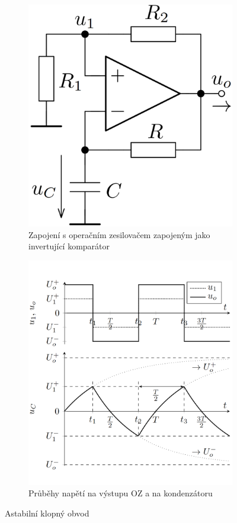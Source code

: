 \documentclass[a4paper,12pt]{article}   %
\begin{document}
\begin{figure}[h!]
    \centering
    \begin{subfigure}{.4\textwidth}
        \centering
        \includegraphics[width=.8\textwidth]{astab_klop.PNG}
        \caption{Zapojení s operačním zesilovačem zapojeným jako invertující komparátor}
        \label{sch:astab:kl}
    \end{subfigure}
    \hspace{2em}%
    \begin{subfigure}{.4\textwidth}
        \centering
        \includegraphics[width =.8\textwidth]{astab_klop-prubehy.PNG}
        \caption{Průběhy napětí na výstupu OZ a na kondenzátoru}
        \label{graf:astab:kl}
    \end{subfigure}
    \caption{Astabilní klopný obvod}
\end{figure}
\end{document}
